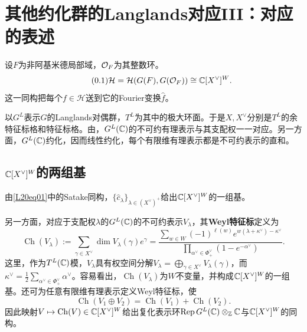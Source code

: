 \chapter{其他约化群的Langlands对应III：对应的表述}\label{L20}
设$F$为非阿基米德局部域，$\mathcal O_F$为其整数环。%
\begin{equation}\tag{0.1}\label{L20eq01}\mathcal H=\mathcal H(G(F),G(\mathcal O_F))\cong\mathbb{C}[X^\vee]^W.\end{equation}
这一同构把每个$f\in\mathcal H$送到它的Fourier变换$\widehat f$。

以$G^L$表示$G$的Langlands对偶群，$T^L$为其中的极大环面。于是$X,X^\vee$分别是$T^L$的余特征标格和特征标格。由，$G^L(\mathbb{C})$的不可约有理表示与其支配权一一对应。另一方面，$G^L(\mathbb{C})$约化，因而线性约化，每个有限维有理表示都是不可约表示的直和。
\section{\texorpdfstring{$\mathbb{C}[X^\vee]^W$}{C[X∨]的W不变环}的两组基}\label{L20S1}
由\eqref{L20eq01}中的Satake同构，$\{\widehat c_\lambda\}_{\lambda\in(X^\vee)^+}$给出$\mathbb{C}[X^\vee]^W$的一组基。

另一方面，对应于支配权$\lambda$的$G^L(\mathbb{C})$的不可约表示$V_\lambda$，其\textbf{Weyl特征标}定义为
\begin{equation}\tag{1.1}\label{L20eq11}
\operatorname{Ch}(V_\lambda):=\sum_{\gamma\in X^\vee}\dim V_\lambda(\gamma)e^\gamma
=\frac{\sum_{w\in W}(-1)^{\ell(w)}e^{w(\lambda+\kappa^\vee)-\kappa^\vee}}{\prod_{\alpha^\vee\in\Phi^\vee_+}(1-e^{-\alpha^\vee})}.
\end{equation}
这里，作为$T^L(\mathbb{C})$模，$V_\lambda$具有权空间分解$V_\lambda=\bigoplus_{\gamma\in X^\vee}V_\lambda(\gamma)$，而$\kappa^\vee=\frac12\sum_{\alpha^\vee\in\Phi^\vee_+}\alpha^\vee$。容易看出，$\operatorname{Ch}(V_\lambda)$为$W$不变量，并构成$\mathbb{C}[X^\vee]^W$的一组基。还可为任意有限维有理表示定义Weyl特征标，使
\[\operatorname{Ch}(V_1\oplus V_2)=\operatorname{Ch}(V_1)+\operatorname{Ch}(V_2).\]
因此映射$V\mapsto\operatorname{Ch}(V)\in\mathbb{C}[X^\vee]^W$给出复化表示环$\operatorname{Rep}G^L(\mathbb{C})\otimes_{\mathbb{Z}}\mathbb{C}$与$\mathbb{C}[X^\vee]^W$的同构。

